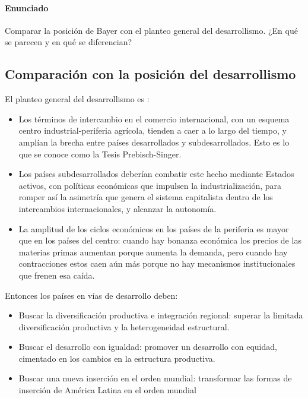 \paragraph{Enunciado}
 Comparar la posición de Bayer con el planteo general del desarrollismo. ¿En qué se parecen y en qué se diferencian?

 \subsection{Comparación con la posición del desarrollismo}

 El planteo general del desarrollismo es :
 \begin{itemize}
     \item Los términos de intercambio en el comercio internacional, con un esquema centro industrial-periferia agrícola, tienden a caer a lo largo del tiempo,  y amplían la brecha entre países desarrollados y subdesarrollados. Esto es lo que se conoce como la Tesis Prebisch-Singer.
     \item Los países subdesarrollados deberían combatir este hecho mediante Estados activos, con políticas económicas que impulsen la industrialización, para romper así la asimetría que genera el sistema capitalista dentro de los intercambios internacionales, y alcanzar la autonomía.
    \item La amplitud de los ciclos económicos en los países de la periferia es mayor que en los países del centro: cuando hay bonanza económica los precios de las materias primas aumentan porque aumenta la demanda, pero cuando hay contracciones estos caen aún más porque no hay mecanismos institucionales que frenen esa caída.
 \end{itemize}

 Entonces los países en vías de desarrollo deben:

 \begin{itemize}
     \item Buscar la diversificación productiva e integración regional:  superar la limitada diversificación productiva y la heterogeneidad estructural.
     \item Buscar el desarrollo con igualdad: promover un desarrollo con equidad, cimentado en los cambios en la estructura productiva.
     \item Buscar una nueva inserción en el orden mundial: transformar las formas de inserción de América Latina en el orden mundial
 \end{itemize}

